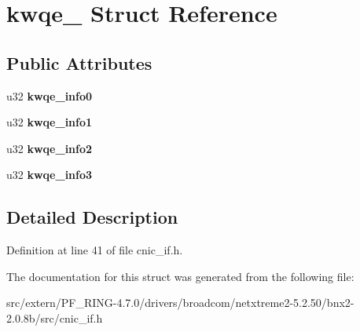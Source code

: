 \hypertarget{structkwqe__16}{
\section{kwqe\_ Struct Reference}
\label{structkwqe__16}
}
\subsection*{Public Attributes}
\begin{DoxyCompactItemize}
\item 
\hypertarget{structkwqe__16_a2dc37b0ddab1f2de0fc21b4252f3cfe2}{
u32 {\bfseries kwqe\_\-info0}}
\label{structkwqe__16_a2dc37b0ddab1f2de0fc21b4252f3cfe2}

\item 
\hypertarget{structkwqe__16_aa2852b657f043aff3806591d92b1899c}{
u32 {\bfseries kwqe\_\-info1}}
\label{structkwqe__16_aa2852b657f043aff3806591d92b1899c}

\item 
\hypertarget{structkwqe__16_a230623509f0fef0ec01864b6f2333c0c}{
u32 {\bfseries kwqe\_\-info2}}
\label{structkwqe__16_a230623509f0fef0ec01864b6f2333c0c}

\item 
\hypertarget{structkwqe__16_ae0619e47efc97d0ccb7145e3c51541e8}{
u32 {\bfseries kwqe\_\-info3}}
\label{structkwqe__16_ae0619e47efc97d0ccb7145e3c51541e8}

\end{DoxyCompactItemize}


\subsection{Detailed Description}


Definition at line 41 of file cnic\_\-if.h.



The documentation for this struct was generated from the following file:\begin{DoxyCompactItemize}
\item 
src/extern/PF\_\-RING-\/4.7.0/drivers/broadcom/netxtreme2-\/5.2.50/bnx2-\/2.0.8b/src/cnic\_\-if.h\end{DoxyCompactItemize}
